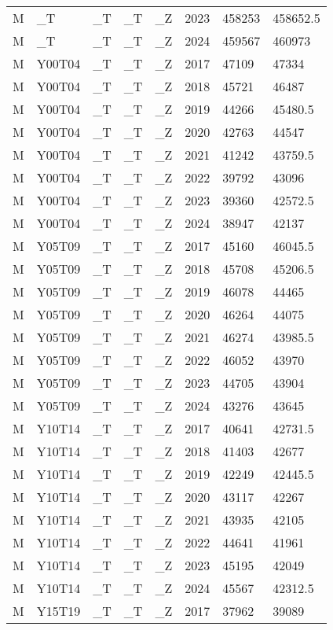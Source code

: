 \begin{longtable}[t]{llllllll}
M & \_T & \_T & \_T & \_Z & 2023 & 458253 & 458652.5\\
\addlinespace
M & \_T & \_T & \_T & \_Z & 2024 & 459567 & 460973\\
M & Y00T04 & \_T & \_T & \_Z & 2017 & 47109 & 47334\\
M & Y00T04 & \_T & \_T & \_Z & 2018 & 45721 & 46487\\
M & Y00T04 & \_T & \_T & \_Z & 2019 & 44266 & 45480.5\\
M & Y00T04 & \_T & \_T & \_Z & 2020 & 42763 & 44547\\
\addlinespace
M & Y00T04 & \_T & \_T & \_Z & 2021 & 41242 & 43759.5\\
M & Y00T04 & \_T & \_T & \_Z & 2022 & 39792 & 43096\\
M & Y00T04 & \_T & \_T & \_Z & 2023 & 39360 & 42572.5\\
M & Y00T04 & \_T & \_T & \_Z & 2024 & 38947 & 42137\\
M & Y05T09 & \_T & \_T & \_Z & 2017 & 45160 & 46045.5\\
\addlinespace
M & Y05T09 & \_T & \_T & \_Z & 2018 & 45708 & 45206.5\\
M & Y05T09 & \_T & \_T & \_Z & 2019 & 46078 & 44465\\
M & Y05T09 & \_T & \_T & \_Z & 2020 & 46264 & 44075\\
M & Y05T09 & \_T & \_T & \_Z & 2021 & 46274 & 43985.5\\
M & Y05T09 & \_T & \_T & \_Z & 2022 & 46052 & 43970\\
\addlinespace
M & Y05T09 & \_T & \_T & \_Z & 2023 & 44705 & 43904\\
M & Y05T09 & \_T & \_T & \_Z & 2024 & 43276 & 43645\\
M & Y10T14 & \_T & \_T & \_Z & 2017 & 40641 & 42731.5\\
M & Y10T14 & \_T & \_T & \_Z & 2018 & 41403 & 42677\\
M & Y10T14 & \_T & \_T & \_Z & 2019 & 42249 & 42445.5\\
\addlinespace
M & Y10T14 & \_T & \_T & \_Z & 2020 & 43117 & 42267\\
M & Y10T14 & \_T & \_T & \_Z & 2021 & 43935 & 42105\\
M & Y10T14 & \_T & \_T & \_Z & 2022 & 44641 & 41961\\
M & Y10T14 & \_T & \_T & \_Z & 2023 & 45195 & 42049\\
M & Y10T14 & \_T & \_T & \_Z & 2024 & 45567 & 42312.5\\
\addlinespace
M & Y15T19 & \_T & \_T & \_Z & 2017 & 37962 & 39089\\

\end{longtable}
